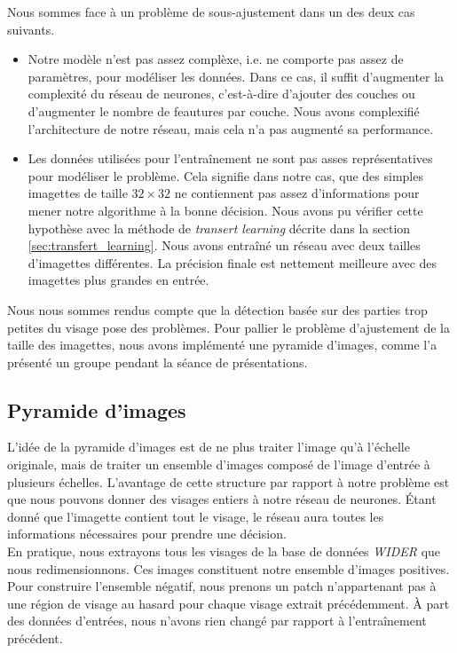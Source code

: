 \documentclass[a4paper,11pt]{article}
\begin{document}
    Nous sommes face à un problème de sous-ajustement dans un des deux cas suivants.
    \begin{itemize}
        \item 
            Notre modèle n'est pas assez complèxe, i.e. ne comporte pas assez de paramètres, pour modéliser les données.
            Dans ce cas, il suffit d'augmenter la complexité du réseau de neurones, c'est-à-dire d'ajouter des couches ou d'augmenter le nombre de feautures par couche.
            Nous avons complexifié l'architecture de notre réseau, mais cela n'a pas augmenté sa performance.

        \item
            Les données utilisées pour l'entraînement ne sont pas asses représentatives pour modéliser le problème.
            Cela signifie dans notre cas, que des simples imagettes de taille $32\times32$ ne contiennent pas assez d'informations pour mener notre algorithme à la bonne décision.
            Nous avons pu vérifier cette hypothèse avec la méthode de \textit{transert learning} décrite dans la section \ref{sec:transfert_learning}.
            Nous avons entraîné un réseau avec deux tailles d'imagettes différentes.
            La précision finale est nettement meilleure avec des imagettes plus grandes en entrée. 
    \end{itemize}

    Nous nous sommes rendus compte que la détection basée sur des parties trop petites du visage pose des problèmes.
    Pour pallier le problème d'ajustement de la taille des imagettes, nous avons implémenté une pyramide d'images, comme l'a présenté un groupe pendant la séance de présentations.

\subsection{Pyramide d'images}

    L'idée de la pyramide d'images est de ne plus traiter l'image qu'à l'échelle originale, mais de traiter un ensemble d'images composé de l'image d'entrée à plusieurs échelles.
    L'avantage de cette structure par rapport à notre problème est que nous pouvons donner des visages entiers à notre réseau de neurones.
    Étant donné que l'imagette contient tout le visage, le réseau aura toutes les informations nécessaires pour prendre une décision.
    \\
    En pratique, nous extrayons tous les visages de la base de données \textit{WIDER} que nous redimensionnons.
    Ces images constituent notre ensemble d'images positives.
    Pour construire l'ensemble négatif, nous prenons un patch n'appartenant pas à une région de visage au hasard pour chaque visage extrait précédemment.
    À part des données d'entrées, nous n'avons rien changé par rapport à l'entraînement précédent.
\end{document}
